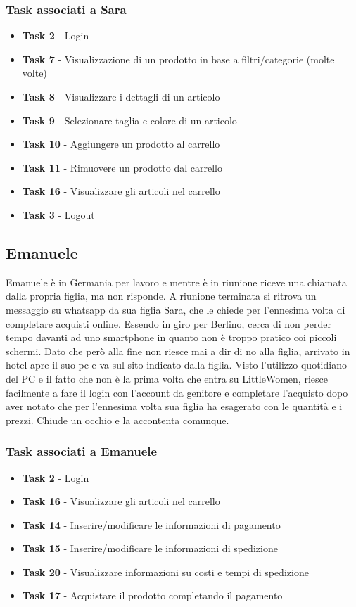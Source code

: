 \documentclass[12pt,a4paper]{report}
\begin{document}
\subsubsection*{Task associati a Sara}
\begin{itemize}
\item \textbf{Task 2} - Login
\item \textbf{Task 7} - Visualizzazione di un prodotto in base a filtri/categorie (molte volte)
\item \textbf{Task 8} - Visualizzare i dettagli di un articolo
\item \textbf{Task 9} - Selezionare taglia e colore di un articolo
\item \textbf{Task 10} - Aggiungere un prodotto al carrello
\item \textbf{Task 11} - Rimuovere un prodotto dal carrello
\item \textbf{Task 16} - Visualizzare gli articoli nel carrello
\item \textbf{Task 3} - Logout
\end{itemize}

\subsection*{Emanuele}
Emanuele è in Germania per lavoro e mentre è in riunione riceve una chiamata dalla propria figlia, ma non risponde. A riunione terminata si ritrova un messaggio su whatsapp da sua figlia Sara, che le chiede per l'ennesima volta di completare acquisti online. Essendo in giro per Berlino, cerca di non perder tempo davanti ad uno smartphone in quanto non è troppo pratico coi piccoli schermi. Dato che però alla fine non riesce mai a dir di no alla figlia, arrivato in hotel apre il suo pc e va sul sito indicato dalla figlia. Visto l'utilizzo quotidiano del PC e il fatto che non è la prima volta che entra su LittleWomen, riesce facilmente a fare il login con l'account da genitore e completare l'acquisto dopo aver notato che per l'ennesima volta sua figlia ha esagerato con le quantità e i prezzi. Chiude un occhio e la accontenta comunque.
\subsubsection*{Task associati a Emanuele}
\begin{itemize}
\item \textbf{Task 2} - Login
\item \textbf{Task 16} - Visualizzare gli articoli nel carrello
\item \textbf{Task 14} - Inserire/modificare le informazioni di pagamento
\item \textbf{Task 15} - Inserire/modificare le informazioni di spedizione
\item \textbf{Task 20} - Visualizzare informazioni su costi e tempi di spedizione
\item \textbf{Task 17} - Acquistare il prodotto completando il pagamento
\end{itemize}
\end{document}
